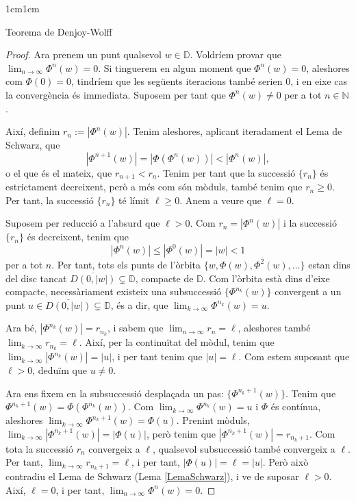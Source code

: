 \begin{adjustwidth}{1cm}{1cm}
\begin{subsection}{Teorema de Denjoy-Wolff}
\begin{proof}
        Ara prenem un punt qualsevol $w\in \mathbb{D}$. Voldríem provar que $\displaystyle\lim_{n\to\infty}\Phi^n(w)=0$. Si tinguerem en algun moment que $\Phi^n(w)=0$, aleshores com $\Phi(0)=0$, tindríem que les següents iteracions també serien $0$, i en eixe cas la convergència és immediata. Suposem per tant que $\Phi^n(w)\neq 0$ per a tot $n\in\mathbb{N}$. 
        
        Així, definim $r_n:=|\Phi^n(w)|$. Tenim aleshores, aplicant iteradament el Lema de Schwarz, que
        \[
            |\Phi^{n+1}(w)|=|\Phi(\Phi^n(w))|<|\Phi^n(w)|,
        \]
        o el que és el mateix, que $r_{n+1}<r_n$. Tenim per tant que la successió $\{r_n\}$ és estrictament decreixent, però a més com són mòduls, també tenim que $r_n\geq 0$. Per tant, la successió $\{r_n\}$ té límit $\ell\geq 0$. Anem a veure que $\ell=0$.

        Suposem per reducció a l'absurd que $\ell>0$. Com $r_n=|\Phi^n(w)|$ i la successió $\{r_n\}$ és decreixent, tenim que 
        \[
            |\Phi^n(w)|\leq|\Phi^0(w)|=|w|<1
        \]
        per a tot $n$. Per tant, tots els punts de l'òrbita $\{w,\Phi(w),\Phi^2(w),\dots\}$ estan dins del disc tancat $\overline{D(0,|w|)}\subsetneq \mathbb{D}$, compacte de $\mathbb{D}$. Com l'òrbita està dins d'eixe compacte, necessàriament existeix una subsuccessió $\{\Phi^{n_k}(w)\}$ convergent a un punt $u\in\overline{D(0,|w|)}\subsetneq \mathbb{D}$, és a dir, que $\displaystyle\lim_{k\to\infty}\Phi^{n_k}(w)=u$.

        Ara bé, $|\Phi^{n_k}(w)|=r_{n_k}$, i sabem que $\displaystyle\lim_{n\to\infty}r_n=\ell$, aleshores també $\displaystyle\lim_{k\to\infty}r_{n_k}=\ell$. Així, per la continuïtat del mòdul, tenim que $\displaystyle\lim_{k\to\infty}|\Phi^{n_k}(w)|=|u|$, i per tant tenim que $|u|=\ell$. Com estem suposant que $\ell>0$, deduïm que $u\neq 0$.

        Ara ens fixem en la subsuccessió desplaçada un pas: $\{\Phi^{n_k+1}(w)\}$. Tenim que $\Phi^{n_k+1}(w)=\Phi(\Phi^{n_k}(w))$. Com $\displaystyle\lim_{k\to\infty}\Phi^{n_k}(w)=u$ i $\Phi$ és contínua, aleshores  $\displaystyle\lim_{k\to\infty}\Phi^{n_k+1}(w)=\Phi(u)$. Prenint mòduls, $\displaystyle\lim_{k\to\infty}|\Phi^{n_k+1}(w)|=|\Phi(u)|$, però tenim que $|\Phi^{n_k+1}(w)|=r_{n_k+1}$. Com tota la successió $r_n$ convergeix a $\ell$, qualsevol subsuccessió també convergeix a $\ell$. Per tant, $\displaystyle\lim_{k\to\infty}r_{n_k+1}=\ell$, i per tant, $|\Phi(u)|=\ell=|u|$. Però això contradiu el Lema de Schwarz (Lema \ref{LemaSchwarz}), i ve de suposar $\ell>0$. Així, $\ell=0$, i per tant, $\displaystyle\lim_{n\to\infty}\Phi^n(w)=0$.


\end{proof}
\end{subsection}
\end{adjustwidth}
